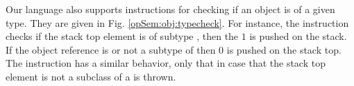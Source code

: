 Our language also supports instructions for checking if an object is of a given type. They are given in Fig. \ref{opSem:obj:typecheck}.
For instance, the instruction \instanceof checks if the stack top element is 
 of subtype \clazz{}, then the   $1$ is pushed on the stack. If 
the object reference is \Mynull or not a subtype of \clazz{} then $0$ is pushed on the stack top. 
The \checkcast{} instruction has a similar behavior, only that in case that the stack top element is not
a subclass of \clazz{} a \ClassCastExc{} is thrown.

\begin{figure}[ht!] 
\end{figure}

